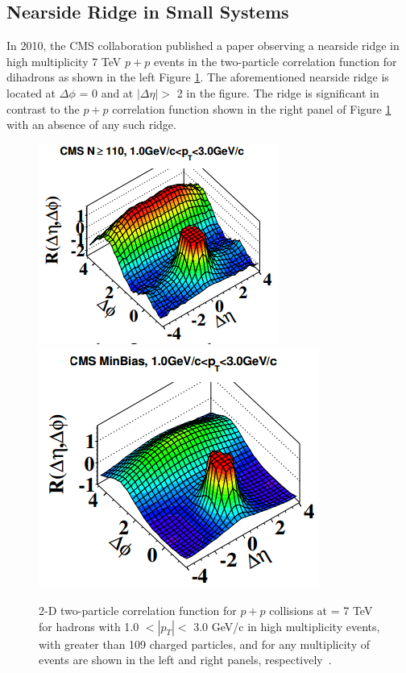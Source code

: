 \subsection{Nearside Ridge in Small Systems}
In 2010, the CMS collaboration published a paper observing a nearside ridge in high multiplicity 7 TeV $p+p$ events in the two-particle correlation function for dihadrons as shown in the left Figure \ref{fig:pp_ridge_plot}. The aforementioned nearside ridge is located at $\Delta\phi$ = 0 and at $|\Delta\eta| > $ 2 in the figure. The ridge is significant in contrast to the $p+p$ correlation function shown in the right panel of Figure \ref{fig:pp_ridge_plot} with an absence of any such ridge.
\begin{figure}[h!]
\begin{center}
\includegraphics[width=0.47\linewidth]{figs/pp_high_multiplicity_ridge.PNG}
\includegraphics[width=0.47\linewidth]{figs/pp_correlation_function_min_bias.png}
\caption{2-D two-particle correlation function for $p+p$ collisions at \sqsn = 7 TeV for hadrons with 1.0 $<|p_T|<$ 3.0 GeV/c in high multiplicity events, with greater than 109 charged particles, and for any multiplicity of events are shown in the left and right panels, respectively~\cite{Khachatryan2010}.}
\label{fig:pp_ridge_plot}
\end{center}
\end{figure}

